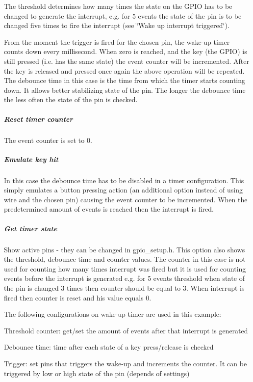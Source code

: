 The threshold determines how many times the state on the G\+P\+I\+O has to be changed to generate the interrupt, e.\+g. for 5 events the state of the pin is to be changed five times to fire the interrupt (see \char`\"{}\+Wake up interrupt triggered\char`\"{}).

From the moment the trigger is fired for the chosen pin, the wake-\/up timer counts down every millisecond. When zero is reached, and the key (the G\+P\+I\+O) is still pressed (i.\+e. has the same state) the event counter will be incremented. After the key is released and pressed once again the above operation will be repeated. The debounce time in this case is the time from which the timer starts counting down. It allows better stabilizing state of the pin. The longer the debounce time the less often the state of the pin is checked.

\subparagraph*{Reset timer counter}

The event counter is set to 0.

\subparagraph*{Emulate key hit}

In this case the debounce time has to be disabled in a timer configuration. This simply emulates a button pressing action (an additional option instead of using wire and the chosen pin) causing the event counter to be incremented. When the predetermined amount of events is reached then the interrupt is fired.

\subparagraph*{Get timer state}

Show active pins -\/ they can be changed in gpio\+\_\+setup.\+h. This option also shows the threshold, debounce time and counter values. The counter in this case is not used for counting how many times interrupt was fired but it is used for counting events before the interrupt is generated e.\+g. for 5 events threshold when state of the pin is changed 3 times then counter should be equal to 3. When interrupt is fired then counter is reset and his value equals 0.

The following configurations on wake-\/up timer are used in this example\+:
\begin{DoxyItemize}
\item Threshold counter\+: get/set the amount of events after that interrupt is generated
\item Debounce time\+: time after each state of a key press/release is checked
\item Trigger\+: set pins that triggers the wake-\/up and increments the counter. It can be triggered by low or high state of the pin (depends of settings)
\end{DoxyItemize}

